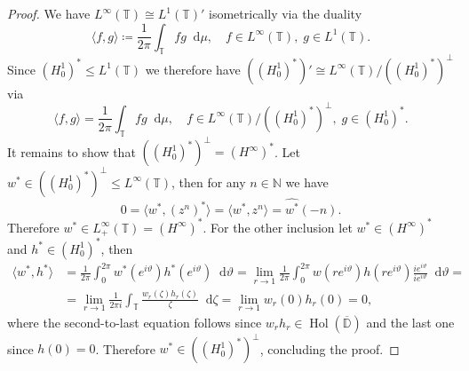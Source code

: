 \documentclass[letterpaper, 11pt]{article}
\newcommand{\D}{\mathbb{D}}
\newcommand{\T}{\mathbb{T}}
\newcommand{\N}{\mathbb{N}}
\newcommand{\1}{\mathds{1}}
\newcommand{\dd}{\mathop{}\!\mathrm{d}}
\newcommand{\cl}[1]{\overline{#1}}
\DeclareMathOperator*{\Hol}{Hol}
\theoremstyle{definition}
\begin{document}
\begin{proof}
  We have $L^\infty(\T) \cong L^1(\T)'$ isometrically via the duality
  $$ \langle f, g \rangle \coloneqq \frac{1}{2\pi} \int_\T f g \dd \mu, \quad f \in L^\infty(\T),\; g \in L^1(\T). $$
  Since $(H_0^1)^* \leq L^1(\T)$ we therefore have $((H_0^1)^*)' \cong L^\infty(\T) / ((H_0^1)^*)^\perp$ via
  $$ \langle f, g \rangle = \frac{1}{2\pi} \int_\T f g \dd \mu, \quad f \in L^\infty(\T) / ((H_0^1)^*)^\perp,\; g \in (H_0^1)^*. $$
  It remains to show that $((H_0^1)^*)^\perp = (H^\infty)^*$. Let $w^* \in ((H_0^1)^*)^\perp \leq L^\infty(\T)$, then for any $n \in \N$ we have
  $$ 0 = \langle w^*, (z^n)^* \rangle = \langle w^*, z^n \rangle = \widehat{w^*}(-n). $$
  Therefore $w^* \in L_+^\infty(\T) = (H^\infty)^*$. For the other inclusion let $w^* \in (H^\infty)^*$ and $h^* \in (H_0^1)^*$, then
  \begin{align*}
    \langle w^*, h^* \rangle &= \frac{1}{2\pi} \int_0^{2 \pi} w^*(e^{i \vartheta}) h^*(e^{i \vartheta}) \dd \vartheta = \lim_{r \to 1} \frac{1}{2\pi} \int_0^{2 \pi} w(r e^{i \vartheta}) h(r e^{i \vartheta}) \frac{ie^{i \vartheta}}{ie^{i \vartheta}} \dd \vartheta = \\
    &= \lim_{r \to 1} \frac{1}{2\pi i} \int_\T \frac{w_r(\zeta) h_r(\zeta)}{\zeta} \dd \zeta = \lim_{r \to 1} w_r(0) h_r(0) = 0,
  \end{align*}
  where the second-to-last equation follows since $w_r h_r \in \Hol(\cl{\D})$ and the last one since $h(0) = 0$. Therefore $w^* \in ((H_0^1)^*)^\perp$, concluding the proof.
\end{proof}
  
\end{document}
